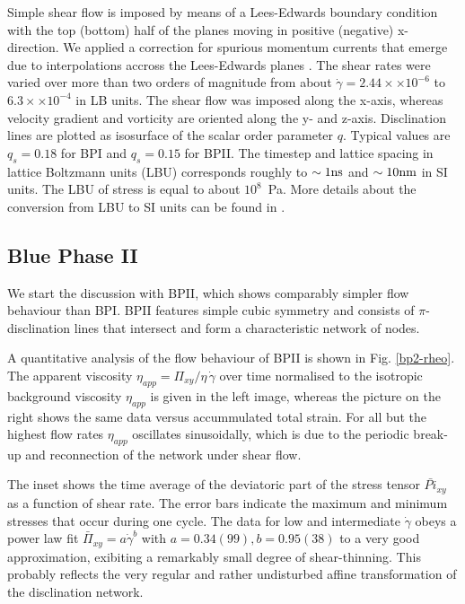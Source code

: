 \documentclass[aps,pre,reprint,superscriptaddress, twocolumn]{revtex4}
\newcommand{\e}[1]{\times10^{#1}}
\newcommand{\gd}{\dot{\gamma}}
\begin{document}
Simple shear flow is imposed by means of a Lees-Edwards boundary condition ~\cite{Wagner:2002} with
the top (bottom) half of the planes moving in positive (negative) x-direction.
We applied a correction for spurious momentum currents that emerge due to interpolations accross 
the Lees-Edwards planes \cite{Henrich:2012a}.
The shear rates were varied over more than two orders of magnitude from about 
$\gd=2.44\times \e{-6}$ to $6.3\times\e{-4}$ in LB units.
The shear flow was imposed along the x-axis, whereas velocity gradient and vorticity are oriented 
along the y- and z-axis.
Disclination lines are plotted as isosurface of the scalar order parameter $q$. Typical values 
are $q_s=0.18$ for BPI and $q_s=0.15$ for BPII.
The timestep and lattice spacing in lattice Boltzmann units (LBU) corresponds roughly to
$\sim 1 {\rm ns}$ and $\sim 10{\rm nm}$ in SI units. The LBU of stress
is equal to about $10^8$~Pa.
More details about the conversion from LBU to SI units can be found in
\cite{Henrich:2011a,Henrich:2010b}.

\subsection{Blue Phase II}

We start the discussion with BPII, which shows comparably simpler flow behaviour than BPI.
BPII features simple cubic symmetry and consists of $\pi$-disclination lines that 
intersect and form a characteristic network of nodes.

A quantitative analysis of the flow behaviour of BPII is shown in Fig. \ref{bp2-rheo}.
The apparent viscosity $\eta_{app}=\Pi_{xy}/\eta\,\gd$ over time normalised to
the isotropic background viscosity $\eta_{app}$ is given in the left image, whereas
the picture on the right shows the same data versus accummulated total strain.
For all but the highest flow rates $\eta_{app}$ oscillates sinusoidally, which
is due to the periodic break-up and reconnection of the network under shear flow.

The inset shows the time average of the deviatoric part of the stress tensor $\bar{Pi}_{xy}$ as a function of shear rate.
The error bars indicate the maximum and minimum stresses that occur during one cycle.
The data for low and intermediate $\gd$ obeys a power law fit $\bar{\Pi}_{xy}=a \gd^b$ with $a=0.34(99), b=0.95(38)$ to
a very good approximation, exibiting a remarkably small degree of shear-thinning.
This probably reflects the very regular and rather undisturbed affine transformation of the disclination network.  
\end{document}
